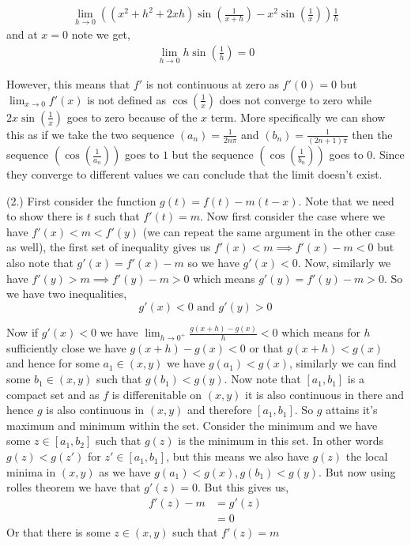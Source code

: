 \documentclass[a4paper]{article}
\begin{document}
    \begin{align*}
        \lim_{h \to 0} \left((x^2 + h^2 + 2xh)\sin \left ( \frac{1}{x + h}\right ) - x^2 \sin \left ( \frac{1}{x}\right ) \right) \frac{1}{h}
    \end{align*}
    and at $x = 0$ note we get, 
    \begin{align*}
        \lim_{h \to 0}  h \sin \left ( \frac{1}{h}\right ) = 0
    \end{align*}



However, this means that $f'$ is not continuous at zero as $f'(0) = 0$ but $\lim_{x \to 0} f'(x)$ is not defined as $\cos \left ( \frac{1}{x}\right )$ does not converge to zero while $2x \sin \left ( \frac{1}{x}\right )$ goes to zero because of the $x$ term. More specifically we can show this as if we take the two sequence $(a_n) = \frac{1}{2n \pi}$  and $(b_n) = \frac{1}{(2n + 1)\pi}$ then the sequence $\left(\cos \left ( \frac{1}{a_n}\right ) \right)$  goes to $1$ but the sequence $\left ( \cos \left ( \frac{1}{b_n}\right )\right )$ goes to $0$. Since they converge to different values we can conclude that the limit doesn't exist.

\vspace{1em}

(2.) First consider the function $g(t) = f(t) - m(t - x)$. Note that we need to show there is $t$ such that $f'(t) = m$. Now first consider the case where we have $f'(x) < m < f'(y)$ (we can repeat the same argument in the other case as well), the first set of inequality gives us $f'(x) < m \implies f'(x) - m < 0$ but also note that $g'(x) = f'(x) - m$ so we have $g'(x) < 0$. Now, similarly we have $f'(y) > m \implies f'(y) - m > 0$ which means $g'(y) = f'(y) - m > 0$. So we have two inequalities, 
\[
    g'(x) < 0 \text{ and } g'(y) > 0
\]

Now if $g'(x) < 0$ we have $\lim_{h \to 0^{+}} \frac{g(x + h) - g(x)}{h} < 0$  which means for $h$ sufficiently close we have $g(x + h) - g(x) < 0$ or that $g(x + h)  < g(x)$ and hence for some $a_{1} \in (x, y)$ we have $g(a_{1}) < g(x)$, similarly we can find some $b_{1} \in (x, y)$ such that $g(b_{1}) < g(y)$. Now note that $[a_{1}, b_{1}]$ is a compact set and as $f$ is differenitable on $(x, y)$ it is also continuous in there and hence $g$ is also continuous in $(x, y)$  and therefore $[a_{1}, b_{1}]$. So $g$ attains it's maximum and minimum within the set. Consider the minimum and we have some $z \in [a_{1}, b_{2}]$ such that $g(z)$ is the minimum in this set. In other words $g(z) < g(z')$ for $z' \in [a_{1}, b_{1}]$, but this means we also have $g(z)$ the local minima in $(x, y)$ as we have $g(a_{1}) < g(x), g(b_{1}) < g(y)$. But now using rolles theorem we have that $g'(z) = 0$. But this gives us, 
\begin{align*}
    f'(z) - m &= g'(z)\\
              &= 0
\end{align*}
Or that there is some $z \in (x, y)$ such that  $f'(z) = m$
\end{document}

